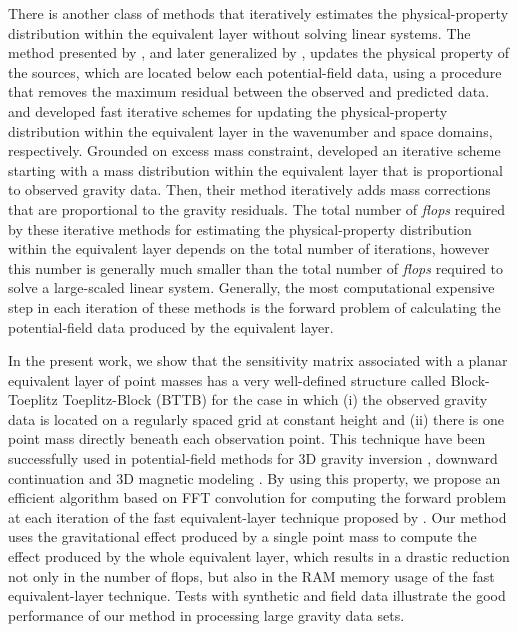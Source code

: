 There is another class of methods that iteratively estimates the physical-property distribution within 
the equivalent layer without solving linear systems.
The method presented by \citet{cordell1992}, and later generalized by \citet{guspi-novara2009}, updates 
the physical property of the sources, which are located below each potential-field data, using a 
procedure that removes the maximum residual between the observed and predicted data.
\citet{xia-sprowl1991} and \citet{xia-etal1993} developed 
fast iterative schemes for updating the physical-property distribution
within the equivalent layer in the wavenumber and space domains, respectively.
Grounded on excess mass constraint, \cite{siqueira-etal2017} developed an iterative scheme 
starting with a mass distribution within the equivalent layer that is proportional to observed gravity data.
Then, their method iteratively adds mass corrections that are proportional to the gravity residuals.
The total number of \textit{flops} required by these iterative methods for estimating the physical-property 
distribution within the equivalent layer depends on the total number of iterations, however this number is 
generally much smaller than the total number of \textit{flops} required to solve a large-scaled linear system. 
Generally, the most computational expensive step in each iteration of these methods is the forward problem 
of calculating the potential-field data produced by the equivalent layer.

In the present work, we show that the sensitivity matrix associated with a planar equivalent layer 
of point masses has a very well-defined structure called Block-Toeplitz Toeplitz-Block (BTTB) for 
the case in which (i) the observed gravity data is located on a regularly spaced grid at constant 
height and (ii) there is one point mass directly beneath each observation point.
This technique have been successfully used in potential-field methods for 
3D gravity inversion \citep{zhang-wong2015}, downward continuation 
\citep{zhang-etal2016} and 3D magnetic modeling \citep{qiang_etal2019}.
By using this property, we propose an efficient algorithm based on FFT convolution 
\citep[e.g.,][ p. 207]{vanloan1992} for computing the forward problem at each iteration of 
the fast equivalent-layer technique proposed by \citet{siqueira-etal2017}.
Our method uses the gravitational effect produced by a single point mass to compute the 
effect produced by the whole equivalent layer, which results in a drastic reduction 
not only in the number of flops, but also in the RAM memory usage of the fast equivalent-layer technique.
Tests with synthetic and field data illustrate the good performance of our method in processing 
large gravity data sets.



